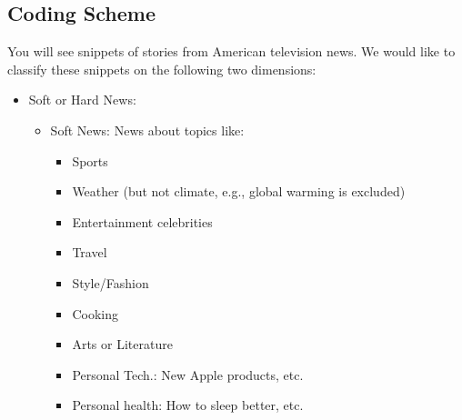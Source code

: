 \documentclass[12pt, letterpaper]{article}
\begin{document}
\subsection{Coding Scheme}
\label{appendix:coding_scheme}

You will see snippets of stories from American television news. We would like to classify these snippets on the following two dimensions:

\begin{itemize}

    \item    Soft or Hard News:
        \begin{itemize}
            \item Soft News: News about topics like:
            \begin{itemize}
                \item Sports
                \item Weather (but not climate, e.g., global warming is excluded)
                \item Entertainment celebrities 
                \item Travel
                \item Style/Fashion
                \item Cooking
                \item Arts or Literature
                \item Personal Tech.: New Apple products, etc.
                \item Personal health: How to sleep better, etc. 
            \end{itemize}
    

\end{itemize}
\end{itemize}
\end{document}
